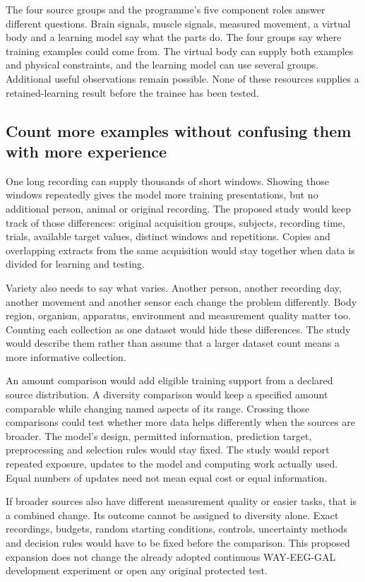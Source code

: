 The four source groups and the programme's five component roles answer different questions. Brain signals, muscle signals, measured movement, a virtual body and a learning model say what the parts do. The four groups say where training examples could come from. The virtual body can supply both examples and physical constraints, and the learning model can use several groups. Additional useful observations remain possible. None of these resources supplies a retained-learning result before the trainee has been tested.

\subsection{Count more examples without confusing them with more experience}

One long recording can supply thousands of short windows. Showing those windows repeatedly gives the model more training presentations, but no additional person, animal or original recording. The proposed study would keep track of those differences: original acquisition groups, subjects, recording time, trials, available target values, distinct windows and repetitions. Copies and overlapping extracts from the same acquisition would stay together when data is divided for learning and testing.

Variety also needs to say what varies. Another person, another recording day, another movement and another sensor each change the problem differently. Body region, organism, apparatus, environment and measurement quality matter too. Counting each collection as one dataset would hide these differences. The study would describe them rather than assume that a larger dataset count means a more informative collection.

An amount comparison would add eligible training support from a declared source distribution. A diversity comparison would keep a specified amount comparable while changing named aspects of its range. Crossing those comparisons could test whether more data helps differently when the sources are broader. The model's design, permitted information, prediction target, preprocessing and selection rules would stay fixed. The study would report repeated exposure, updates to the model and computing work actually used. Equal numbers of updates need not mean equal cost or equal information.

If broader sources also have different measurement quality or easier tasks, that is a combined change. Its outcome cannot be assigned to diversity alone. Exact recordings, budgets, random starting conditions, controls, uncertainty methods and decision rules would have to be fixed before the comparison. This proposed expansion does not change the already adopted continuous WAY-EEG-GAL development experiment or open any original protected test.

